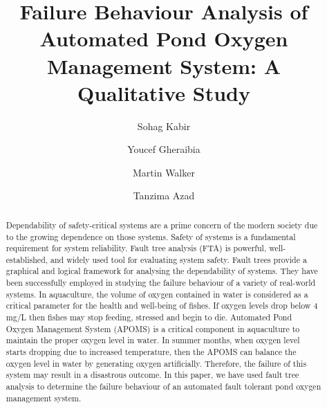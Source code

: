 \documentclass[10pt]{llncs}
\begin{document}
%
\title{Failure Behaviour Analysis of Automated Pond Oxygen Management System: A Qualitative Study}

\author{Sohag Kabir\and Youcef Gheraibia \and Martin Walker\and Tanzima Azad}
\maketitle


\begin{abstract}
Dependability of safety-critical systems are a prime concern of the modern society due to the growing dependence on those systems. Safety of systems is a fundamental requirement for system reliability. Fault tree analysis (FTA) is powerful, well-established,  and widely used tool for evaluating system safety. Fault trees provide a graphical and logical framework for analysing the dependability of systems. They have been successfully employed in studying the failure behaviour of a variety of real-world systems. In aquaculture, the volume of oxygen contained in water is considered as a critical parameter for the health and well-being of fishes. If oxygen levels drop below 4 mg/L then fishes may stop feeding, stressed and begin to die. Automated Pond Oxygen Management System (APOMS) is a critical component in aquaculture to maintain the proper oxygen level in water. In summer months, when oxygen level starts dropping due to increased temperature, then the APOMS can balance the oxygen level in water by generating oxygen artificially. Therefore, the failure of this system may result in a disastrous outcome. In this paper, we have used fault tree analysis to determine the failure behaviour of an automated fault tolerant pond oxygen management system.
\end{abstract}
\end{document}

